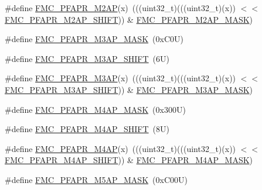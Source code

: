 \begin{DoxyCompactItemize}
\item 
\#define \mbox{\hyperlink{group___f_m_c___register___masks_ga625b34ad30829e1f89f056738b94bcff}{F\+M\+C\+\_\+\+P\+F\+A\+P\+R\+\_\+\+M2\+AP}}(x)~(((uint32\+\_\+t)(((uint32\+\_\+t)(x)) $<$$<$ \mbox{\hyperlink{group___f_m_c___register___masks_ga05f65455021f093de56e9e086f7185ee}{F\+M\+C\+\_\+\+P\+F\+A\+P\+R\+\_\+\+M2\+A\+P\+\_\+\+S\+H\+I\+FT}})) \& \mbox{\hyperlink{group___f_m_c___register___masks_gab3e23f648e34da06b351ac745476f30c}{F\+M\+C\+\_\+\+P\+F\+A\+P\+R\+\_\+\+M2\+A\+P\+\_\+\+M\+A\+SK}})
\item 
\#define \mbox{\hyperlink{group___f_m_c___register___masks_gae2347dc5794bb1de5793cd2a1c31854f}{F\+M\+C\+\_\+\+P\+F\+A\+P\+R\+\_\+\+M3\+A\+P\+\_\+\+M\+A\+SK}}~(0x\+C0\+U)
\item 
\#define \mbox{\hyperlink{group___f_m_c___register___masks_gacb37659011a95dffc2216ccedfafb212}{F\+M\+C\+\_\+\+P\+F\+A\+P\+R\+\_\+\+M3\+A\+P\+\_\+\+S\+H\+I\+FT}}~(6\+U)
\item 
\#define \mbox{\hyperlink{group___f_m_c___register___masks_ga958e56a4db58fd1840e7460f611af1fa}{F\+M\+C\+\_\+\+P\+F\+A\+P\+R\+\_\+\+M3\+AP}}(x)~(((uint32\+\_\+t)(((uint32\+\_\+t)(x)) $<$$<$ \mbox{\hyperlink{group___f_m_c___register___masks_gacb37659011a95dffc2216ccedfafb212}{F\+M\+C\+\_\+\+P\+F\+A\+P\+R\+\_\+\+M3\+A\+P\+\_\+\+S\+H\+I\+FT}})) \& \mbox{\hyperlink{group___f_m_c___register___masks_gae2347dc5794bb1de5793cd2a1c31854f}{F\+M\+C\+\_\+\+P\+F\+A\+P\+R\+\_\+\+M3\+A\+P\+\_\+\+M\+A\+SK}})
\item 
\#define \mbox{\hyperlink{group___f_m_c___register___masks_ga7a4045976082b3e527eddd6a51204aaa}{F\+M\+C\+\_\+\+P\+F\+A\+P\+R\+\_\+\+M4\+A\+P\+\_\+\+M\+A\+SK}}~(0x300\+U)
\item 
\#define \mbox{\hyperlink{group___f_m_c___register___masks_gab5d59455fa080c08cf37d632a2b698cc}{F\+M\+C\+\_\+\+P\+F\+A\+P\+R\+\_\+\+M4\+A\+P\+\_\+\+S\+H\+I\+FT}}~(8\+U)
\item 
\#define \mbox{\hyperlink{group___f_m_c___register___masks_ga20f0161a402dbe046613f474f38ab1e7}{F\+M\+C\+\_\+\+P\+F\+A\+P\+R\+\_\+\+M4\+AP}}(x)~(((uint32\+\_\+t)(((uint32\+\_\+t)(x)) $<$$<$ \mbox{\hyperlink{group___f_m_c___register___masks_gab5d59455fa080c08cf37d632a2b698cc}{F\+M\+C\+\_\+\+P\+F\+A\+P\+R\+\_\+\+M4\+A\+P\+\_\+\+S\+H\+I\+FT}})) \& \mbox{\hyperlink{group___f_m_c___register___masks_ga7a4045976082b3e527eddd6a51204aaa}{F\+M\+C\+\_\+\+P\+F\+A\+P\+R\+\_\+\+M4\+A\+P\+\_\+\+M\+A\+SK}})
\item 
\#define \mbox{\hyperlink{group___f_m_c___register___masks_ga85d2b86b0ca3d8a66162fbf7b5394ad7}{F\+M\+C\+\_\+\+P\+F\+A\+P\+R\+\_\+\+M5\+A\+P\+\_\+\+M\+A\+SK}}~(0x\+C00\+U)
$$
\end{DoxyCompactItemize}
